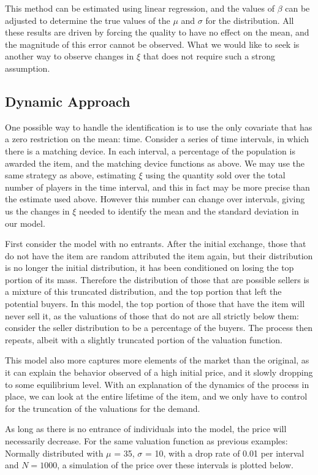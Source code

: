 \documentclass[12pt, letterpaper]{paper}
\begin{document}
This method can be estimated using linear regression, and the values
of $\beta$ can be adjusted to determine the true values of the $\mu$ and $\sigma$ for
the distribution. All these results are driven by forcing the
quality to have no effect on the mean, and the magnitude of this error
cannot be observed. What we would like to seek is another way to
observe changes in $\xi$ that does not require such a strong assumption.

\subsection{Dynamic Approach}
\label{sec-2-3}
One possible way to handle the identification is to use the only
covariate that has a zero restriction on the mean: time. Consider a
series of time intervals, in which there is a matching device. In each
interval, a percentage of the population is awarded the item, and the
matching device functions as above. We may use the same strategy as
above, estimating $\xi$ using the quantity sold over the total number of
players in the time interval, and this in fact may be more precise
than the estimate used above. However this number can change over
intervals, giving us the changes in $\xi$ needed to identify the mean and
the standard deviation in our model.

First consider the model with no entrants. After the initial
exchange, those that do not have the item are random attributed the
item again, but their distribution is no longer the initial
distribution, it has been conditioned on losing the top portion of its
mass. Therefore the distribution of those that are possible sellers is
a mixture of this truncated distribution, and the top portion that
left the potential buyers. In this model, the top portion of
those that have the item will never sell it, as the valuations of
those that do not are all strictly below them: consider the
seller distribution to be a percentage of the buyers. The process then
repeats, albeit with a slightly truncated portion of the valuation
function. 

This model also more captures more elements of the market than the
original, as it can explain the behavior observed of a high initial
price, and it slowly dropping to some equilibrium level. With an
explanation of the dynamics of the process in place, we can look at
the entire lifetime of the item, and we only have to control for the
truncation of the valuations for the demand. 

As long as there is no entrance of individuals into the model, the
price will necessarily decrease. For the same valuation function as
previous examples: Normally distributed with $\mu$ = 35, $\sigma$ = 10, with a
drop rate of 0.01 per interval and $N = 1000$, a simulation of the price
over these intervals is plotted below.
\end{document}
